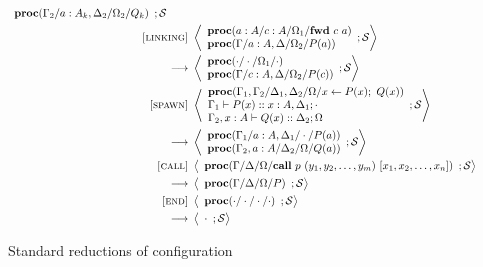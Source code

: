 \documentclass[12pt, openany]{memoir}
\newcommand*{\call}[3]{\textbf{call}\ #1\ (#2)\ [#3]}
\newcommand*{\fwd}[2]{\textbf{fwd}\ #1\ #2}
\newcommand*{\spawn}[3]{#3 \leftarrow #1(#3);\ #2(#3)}
\newcommand*{\judge}[4]{#1 \vdash #2 :: #3; #4}
\newcommand*{\procObj}[4]{\textbf{proc}(#1/#2/#3/#4)}
\newcommand*{\cancelSet}[0]{\mathcal{S}}
\begin{document}
\begin{figure}[H]
\begin{alignat}{2}
{\begin{array}{l}
          \procObj{\Gamma_2}{a : A_k, \Delta_2}{\Omega_2}{Q_k}
        \end{array}
        ; \cancelSet
    } \tag*{} \\
    \label{forward} \textsc{[linking]} & ~ 
      \Braket{
        \begin{array}{l}
          \procObj{a : A}{c : A}{\Omega_1}{\fwd{c}{a}} \\
          \procObj{\Gamma}{a : A, \Delta}{\Omega_2}{P(a)}
        \end{array}
        ; \cancelSet
      } \tag*{} \\ ~ \longrightarrow & ~ 
      \Braket{
        \begin{array}{l}
          \procObj{\cdot}{\cdot}{\Omega_1}{\cdot} \\
          \procObj{\Gamma}{c : A, \Delta}{\Omega_2}{P(c)}
        \end{array}
        ; \cancelSet
    } \tag*{} \\
    \label{spawn} \textsc{[spawn]} & ~ 
      \Braket{
        \begin{array}{l}
          \procObj{\Gamma_1, \Gamma_2}{\Delta_1, \Delta_2}{\Omega}{\spawn{P}{Q}{x}}\\
          \judge{\Gamma_1}{P(x)}{x : A, \Delta_1}{\cdot}\\
          \judge{\Gamma_2, x : A}{Q(x)}{\Delta_2}{\Omega}
        \end{array}
        ; \cancelSet
      } \tag*{} \\ ~ \longrightarrow & ~ 
      \Braket{
        \begin{array}{l}
          \procObj{\Gamma_1}{a : A, \Delta_1}{\cdot}{P(a)} \\
          \procObj{\Gamma_2, a : A}{\Delta_2}{\Omega}{Q(a)}
        \end{array}
        ; \cancelSet
    } \tag*{} \\
    \label{call} \textsc{[call]} & ~ 
      \Braket{
        \begin{array}{l}
          \procObj{\Gamma}{\Delta}{\Omega}{\call{p}{y_1, y_2, \ldots, y_m}{x_1, x_2, \ldots, x_n}}
        \end{array}
        ; \cancelSet
      } \tag*{} \\ ~ \longrightarrow & ~ 
      \Braket{
        \begin{array}{l}
          \procObj{\Gamma}{\Delta}{\Omega}{P}
        \end{array}
        ; \cancelSet
    } \tag*{} \\
    \label{finish} \textsc{[end]} & ~ 
      \Braket{
        \begin{array}{l}
          \procObj{\cdot}{\cdot}{\cdot}{\cdot}
        \end{array}
        ; \cancelSet
      } \tag*{} \\ ~ \longrightarrow & ~ 
      \Braket{
        \begin{array}{l}
          \cdot
        \end{array}
        ; \cancelSet
    } \tag*{}
  \end{alignat}
  \raggedleft
  \caption{Standard reductions of configuration}
  \label{fig:stdreduction}
\end{figure}
\end{document}
